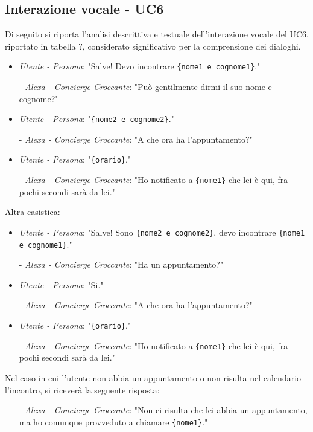 \subsection{Interazione vocale - UC6}
Di seguito si riporta l'analisi descrittiva e testuale dell'interazione vocale del UC6, riportato in tabella ?, considerato significativo per la comprensione dei dialoghi.
\begin{itemize}
	\item \textit{Utente - Persona}: "Salve! Devo incontrare \texttt{\{nome1 e cognome1\}}."
	\item[-] \textit{Alexa - Concierge Croccante}:  "Può gentilmente dirmi il suo nome e cognome?" 
	\item \textit{Utente - Persona}: "\texttt{\{nome2 e cognome2\}}."
	\item[-] \textit{Alexa - Concierge Croccante}:  "A che ora ha l'appuntamento?"
	\item \textit{Utente - Persona}: "\texttt{\{orario\}}."
	\item[-] \textit{Alexa - Concierge Croccante}:  "Ho notificato a \texttt{\{nome1\}} che lei è qui, fra pochi secondi sarà da lei."
\end{itemize}
Altra casistica:
\begin{itemize}
	\item \textit{Utente - Persona}: "Salve! Sono \texttt{\{nome2 e cognome2\}}, devo incontrare \texttt{\{nome1 e cognome1\}}."
	\item[-] \textit{Alexa - Concierge Croccante}:  "Ha un appuntamento?"
	\item \textit{Utente - Persona}: "Si."
	\item[-] \textit{Alexa - Concierge Croccante}:  "A che ora ha l'appuntamento?"
	\item \textit{Utente - Persona}: "\texttt{\{orario\}}."
	\item[-] \textit{Alexa - Concierge Croccante}:  "Ho notificato a \texttt{\{nome1\}} che lei è qui, fra pochi secondi sarà da lei."
\end{itemize}
Nel caso in cui l'utente non abbia un appuntamento o non risulta nel calendario l'incontro, si riceverà la seguente risposta: 
\begin{itemize}
	\item[-] \textit{Alexa - Concierge Croccante}:  "Non ci risulta che lei abbia un appuntamento, ma ho comunque provveduto a chiamare \texttt{\{nome1\}}."
\end{itemize}
\newpage
